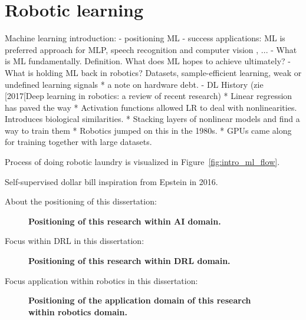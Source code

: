 \documentclass[\home/main.tex]{subfiles}
\begin{document}
\section{Robotic learning}
Machine learning introduction:
    - positioning ML %
    - success applications: ML is preferred approach for MLP, speech recognition and computer vision , ... 
    - What is ML fundamentally. Definition. What does ML hopes to achieve ultimately? 
    - What is holding ML back in robotics? 
        Datasets, sample-efficient learning, weak or undefined learning signals 
        * a note on hardware debt.
    - DL History    (zie [2017[Deep learning in robotics: a review of recent research)
        * Linear regression has paved the way 
        * Activation functions allowed LR to deal with nonlinearities. Introduces biological similarities. 
        * Stacking layers of nonlinear models and find a way to train them
        * Robotics jumped on this in the 1980s.
        * GPUs came along for training together with large datasets. 


Process of doing robotic laundry is visualized in Figure~\ref{fig:intro_ml_flow}.


Self-supervised dollar bill inspiration from Epstein in 2016.


About the positioning of this dissertation:
\begin{figure}[htbp!]
    \centering
    
    
    \caption{\textbf{Positioning of this research within AI domain.}}
    \label{fig:venn_positioning_thesis}
\end{figure}

Focus within \gls{DRL} in this dissertation:
\begin{figure}[htb]
    \centering
        
    \caption{\textbf{Positioning of this research within DRL domain.}}
    \label{fig:RL_loop_positioning}
\end{figure}

Focus application within robotics in this dissertation:
\begin{figure}[htb]
    \centering
        
    \caption{\textbf{Positioning of the application domain of this research within robotics domain.}}
    \label{fig:RL_loop_positioning}
\end{figure}
\end{document}

